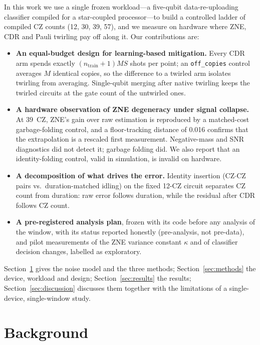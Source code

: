 \documentclass[conference]{IEEEtran}
\newcommand{\arm}[1]{\texttt{#1}}
\begin{document}
In this work we use a single frozen workload---a five-qubit data-re-uploading classifier
compiled for a star-coupled processor---to build a controlled ladder of compiled CZ counts
(12, 30, 39, 57), and we measure on hardware where ZNE, CDR and Pauli twirling pay off along
it. Our contributions are:
\begin{itemize}
  \item \textbf{An equal-budget design for learning-based mitigation.} Every CDR arm spends
  exactly $(n_{\text{train}}+1)MS$ shots per point; an \arm{off\_copies} control averages $M$
  identical copies, so the difference to a twirled arm isolates twirling from averaging.
  Single-qubit merging after native twirling keeps the twirled circuits at the gate count
  of the untwirled ones.
  \item \textbf{A hardware observation of ZNE degeneracy under signal collapse.} At 39~CZ,
  ZNE's gain over raw estimation is reproduced by a matched-cost garbage-folding control, and
  a floor-tracking distance of 0.016 confirms that the extrapolation is a rescaled first
  measurement. Negative-mass and SNR diagnostics did not detect it; garbage folding did.
  We also report that an identity-folding control, valid in simulation, is invalid on
  hardware.
  \item \textbf{A decomposition of what drives the error.} Identity insertion (CZ$\cdot$CZ
  pairs vs.\ duration-matched idling) on the fixed 12-CZ circuit separates CZ count from
  duration: raw error follows duration, while the residual after CDR follows CZ count.
  \item \textbf{A pre-registered analysis plan}, frozen with its code before any analysis of
  the window, with its status reported honestly (pre-analysis, not pre-data), and pilot
  measurements of the ZNE variance constant $\kappa$ and of classifier decision changes,
  labelled as exploratory.
\end{itemize}

Section~\ref{sec:background} gives the noise model and the three methods; Section~\ref{sec:methods}
the device, workload and design; Section~\ref{sec:results} the results; Section~\ref{sec:discussion}
discusses them together with the limitations of a single-device, single-window study.

\section{Background}\label{sec:background}
\end{document}
